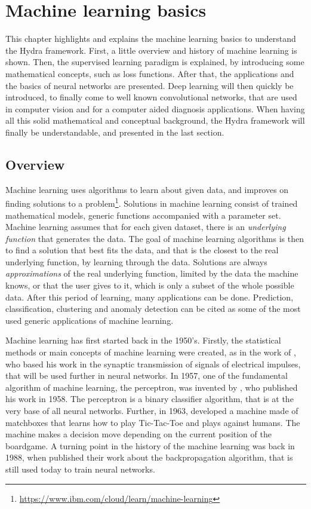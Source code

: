 
\chapter{Machine learning basics}
\label{ch:mlbasics}
This chapter highlights and explains the machine learning basics to understand the Hydra framework. First, a little overview and history of machine learning is shown. Then, the supervised learning paradigm is explained, by introducing some mathematical concepts, such as loss functions. After that, the applications and the basics of neural networks are presented. Deep learning will then quickly be introduced, to finally come to well known convolutional networks, that are used in computer vision and for a computer aided diagnosis applications. When having all this solid mathematical and conceptual background, the Hydra framework will finally be understandable, and presented in the last section.

\section{Overview}
\label{sec:mloverview}
Machine learning uses algorithms to learn about given data, and improves on finding solutions to a problem\footnote{\url{https://www.ibm.com/cloud/learn/machine-learning}}. Solutions in machine learning consist of trained mathematical models, generic functions accompanied with a parameter set. Machine learning assumes that for each given dataset, there is an \emph{underlying function} that generates the data. The goal of machine learning algorithms is then to find a solution that best fits the data, and that is the closest to the real underlying function, by learning through the data. Solutions are always \emph{approximations} of the real underlying function, limited by the data the machine knows, or that the user gives to it, which is only a subset of the whole possible data. After this period of learning, many applications can be done. Prediction, classification, clustering and anomaly detection can be cited as some of the most used generic applications of machine learning.

Machine learning has first started back in the 1950's. Firstly, the statistical methods or main concepts of machine learning were created, as in the work of \citet{hebb_organization_2002}, who based his work in the synaptic transmission of signals of electrical impulses, that will be used further in neural networks. In 1957, one of the fundamental algorithm of machine learning, the perceptron, was invented by \citet{rosenblatt_perceptron_1958}, who published his work in 1958. The perceptron is a binary classifier algorithm, that is at the very base of all neural networks. Further, in 1963, \citet{michie_boxes_1968} developed a machine made of matchboxes that learns how to play Tic-Tac-Toe and plays against humans. The machine makes a decision move depending on the current position of the boardgame. A turning point in the history of the machine learning was back in 1988, when \citet{lecun_theoretical_1988} published their work about the backpropagation algorithm, that is still used today to train neural networks.

